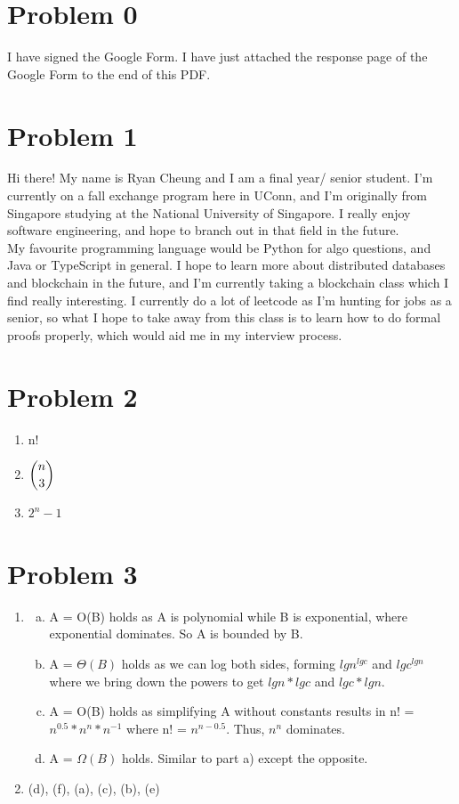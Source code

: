 \documentclass[12pt,letterpaper]{article}
\begin{document}
\section*{Problem 0}
I have signed the Google Form. I have just attached the response page of the Google Form to the end of this PDF.

\section*{Problem 1}
Hi there! My name is Ryan Cheung and I am a final year/ senior student. 
I'm currently on a fall exchange program here in UConn, and I'm originally from Singapore studying at the National University of Singapore. 
I really enjoy software engineering, and hope to branch out in that field in the future. \\

My favourite programming language would be Python for algo questions, and Java or TypeScript in general. 
I hope to learn more about distributed databases and blockchain in the future, 
and I'm currently taking a blockchain class which I find really interesting.
I currently do a lot of leetcode as I'm hunting for jobs as a senior, 
so what I hope to take away from this class is to learn how to do formal proofs properly, which would aid me in my interview process.

\section*{Problem 2}

\begin{enumerate}
  \item
    n!
  \item
    $\dbinom{n}{3}$
  \item 
    $2^n - 1$
\end{enumerate}

\section*{Problem 3}

\begin{enumerate}
  \item
    \begin{enumerate}[a)]
      \item A = O(B) holds as A is polynomial while B is exponential, where exponential dominates. 
      So A is bounded by B.
      \item A = $\Theta(B)$ holds as we can log both sides, forming  
      $lgn^{lgc}$ and $lgc^{lgn}$ where we bring down the powers to get
      $lgn * lgc$ and $lgc * lgn$.
      \item A = O(B) holds as simplifying A without constants results in 
      n! = $n^{0.5} * n^n * n^{-1}$ where n! = $n^{n - 0.5}$.
      Thus, $n^n$ dominates.
      \item A = $\Omega(B)$ holds. Similar to part a) except the opposite.
    \end{enumerate}
  \item
    (d), (f), (a), (c), (b), (e)
\end{enumerate}
\end{document}
